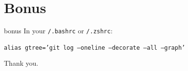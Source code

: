 \documentclass[usenames,dvipsnames,9pt]{beamer}
\newcommand{\textapprox}{\raisebox{0.5ex}{\texttildelow}}
\begin{document}
%
%
\section{Bonus}


\begin{frame}[fragile]{bonus}
  In your \;\texttt{\textapprox/.bashrc} or \;\texttt{\textapprox/.zshrc}:

  \texttt{alias gtree='git log --oneline --decorate --all --graph'}
\end{frame}


\begin{frame}[standout]
Thank you.
\end{frame}
\end{document}
